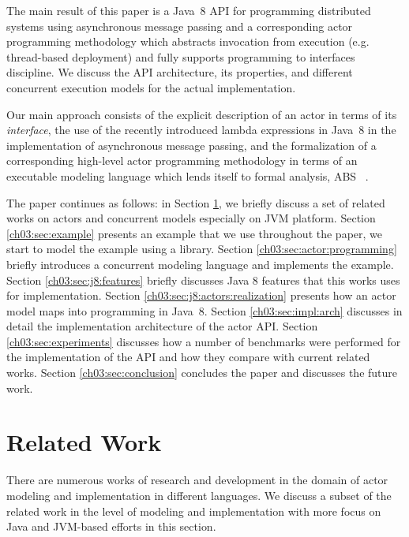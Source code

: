The main result of this paper is a Java~8 API for programming distributed systems
using asynchronous message passing and a corresponding actor programming methodology 
which abstracts invocation from execution (e.g. thread-based deployment) and fully supports
 programming to interfaces discipline.
We  discuss the API architecture, its properties, and different concurrent execution models for the actual implementation.

Our main approach consists of the explicit description of an actor in terms of its \emph{interface}, 
the use of the recently introduced lambda expressions in Java~8 in the  implementation of asynchronous message passing,  
and the formalization of a corresponding high-level actor programming methodology in terms of an executable modeling language
which lends itself to formal analysis, ABS ~\cite{johnsen2012abs}.

The paper continues as follows: 
in Section \ref{ch03:sec:relatedwork}, we briefly discuss a set of related works on actors and concurrent models especially on JVM platform. 
Section \ref{ch03:sec:example} presents an example that we use throughout the paper, we start to model the example using a library. 
Section \ref{ch03:sec:actor:programming} briefly introduces a concurrent modeling language and implements the example.
Section \ref{ch03:sec:j8:features} briefly discusses Java 8 features that this works uses for implementation.
Section \ref{ch03:sec:j8:actors:realization} presents how an actor model maps into programming in Java~8.
Section \ref{ch03:sec:impl:arch} discusses in detail the implementation architecture of the actor API.
Section \ref{ch03:sec:experiments} discusses how a number of benchmarks were performed for the implementation of the API and how they compare with current related works.
Section \ref{ch03:sec:conclusion} concludes the paper and discusses the future work.

 
\section{Related Work}
\label{ch03:sec:relatedwork}

There are numerous works of research and development in the domain of actor modeling and implementation in different languages.
We discuss a subset of the related work in the level of modeling and implementation with more focus on Java and JVM-based efforts in this section.

